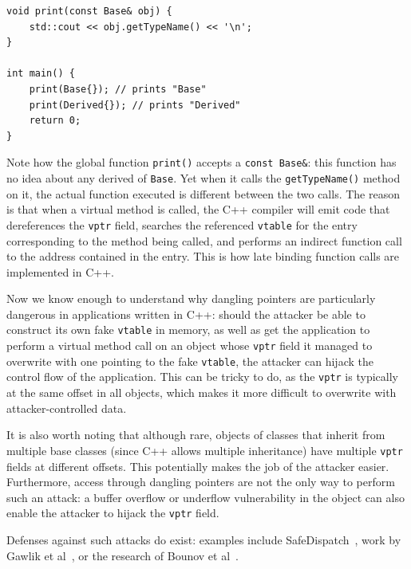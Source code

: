 \begin{lstlisting}
void print(const Base& obj) {
	std::cout << obj.getTypeName() << '\n';
}

int main() {
	print(Base{}); // prints "Base"
	print(Derived{}); // prints "Derived"
	return 0;
}
\end{lstlisting}

Note how the global function \lstinline!print()! accepts a \lstinline!const Base&!: this function has no idea about any derived of \lstinline!Base!. Yet when it calls the \lstinline!getTypeName()! method on it, the actual function executed is different between the two calls. The reason is that when a virtual method is called, the C++ compiler will emit code that dereferences the \texttt{vptr} field, searches the referenced \texttt{vtable} for the entry corresponding to the method being called, and performs an indirect function call to the address contained in the entry. This is how late binding function calls are implemented in C++.

Now we know enough to understand why dangling pointers are particularly dangerous in applications written in C++: should the attacker be able to construct its own fake \texttt{vtable} in memory, as well as get the application to perform a virtual method call on an object whose \texttt{vptr} field it managed to overwrite with one pointing to the fake \texttt{vtable}, the attacker can hijack the control flow of the application. This can be tricky to do, as the \texttt{vptr} is typically at the same offset in all objects, which makes it more difficult to overwrite with attacker-controlled data.

It is also worth noting that although rare, objects of classes that inherit from multiple base classes (since C++ allows multiple inheritance) have multiple \texttt{vptr} fields at different offsets. This potentially makes the job of the attacker easier. Furthermore, access through dangling pointers are not the only way to perform such an attack: a buffer overflow or underflow vulnerability in the object can also enable the attacker to hijack the \texttt{vptr} field.

Defenses against such attacks do exist: examples include SafeDispatch~\cite{cpp-vptr-safedispatch}, work by Gawlik et al~\cite{cpp-vptr-gawlik}, or the research of Bounov et al~\cite{cpp-vptr-bounov}.